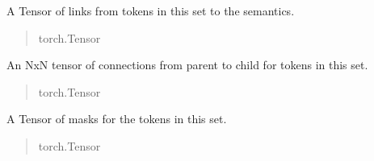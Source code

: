 \documentclass[letterpaper,10pt,english]{sphinxmanual}
\begin{document}
\begin{fulllineitems}

\begin{fulllineitems}
\label{\detokenize{nodes:nodes.nodeTensors.Driver.links}}
\pysigstartsignatures
\pysigline
{}
\pysigstopsignatures
\sphinxAtStartPar
A Tensor of links from tokens in this set to the semantics.
\begin{quote}\begin{description}
\sphinxAtStartPar
torch.Tensor

\end{description}\end{quote}

\end{fulllineitems}


\begin{fulllineitems}
\label{\detokenize{nodes:nodes.nodeTensors.Driver.connections}}
\pysigstartsignatures
\pysigline
{}
\pysigstopsignatures
\sphinxAtStartPar
An NxN tensor of connections from parent to child for tokens in this set.
\begin{quote}\begin{description}
\sphinxAtStartPar
torch.Tensor

\end{description}\end{quote}

\end{fulllineitems}


\begin{fulllineitems}
\label{\detokenize{nodes:nodes.nodeTensors.Driver.masks}}
\pysigstartsignatures
\pysigline
{}
\pysigstopsignatures
\sphinxAtStartPar
A Tensor of masks for the tokens in this set.
\begin{quote}\begin{description}
\sphinxAtStartPar
torch.Tensor

\end{description}\end{quote}


\end{fulllineitems}
\end{fulllineitems}
\end{document}
